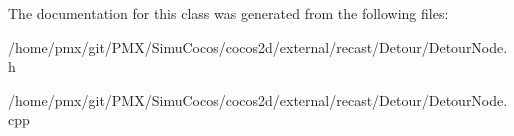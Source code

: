 The documentation for this class was generated from the following files\+:\begin{DoxyCompactItemize}
\item 
/home/pmx/git/\+P\+M\+X/\+Simu\+Cocos/cocos2d/external/recast/\+Detour/Detour\+Node.\+h\item 
/home/pmx/git/\+P\+M\+X/\+Simu\+Cocos/cocos2d/external/recast/\+Detour/Detour\+Node.\+cpp\end{DoxyCompactItemize}
